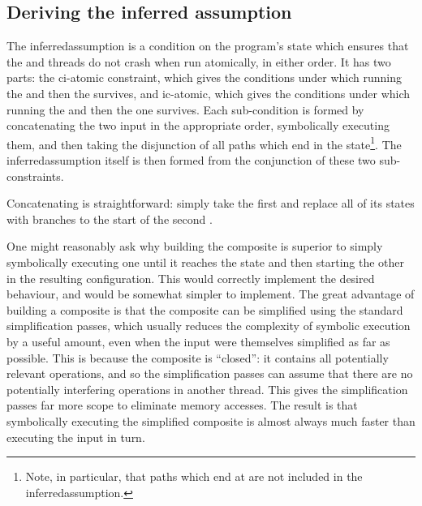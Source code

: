 \subsection{Deriving the inferred assumption}

\label{sect:derive:inferred_assumption}

The \gls{inferredassumption} is a condition on the program's state
which ensures that the  and
 threads do not crash when run
atomically, in either order.  It has two parts: the \gls{ci-atomic}
constraint, which gives the conditions under which running the
 {\StateMachine} and then the
 {\StateMachine} survives, and
\gls{ic-atomic}, which gives the conditions under which running the
 {\StateMachine} and then the
 one survives.  Each sub-condition
is formed by concatenating the two input {\StateMachines} in the
appropriate order, symbolically executing them, and then taking the
disjunction of all paths which end in the {\stSurvive}
state\footnote{Note, in particular, that paths which end at
  {\stUnreached} are not included in the \gls{inferredassumption}.}.
The \gls{inferredassumption} itself is then formed from the
conjunction of these two sub-constraints.

Concatenating {\StateMachines} is straightforward: simply take the
first {\StateMachine} and replace all of its {\stSurvive} states
with branches to the start of the second {\StateMachine}.

 One might reasonably ask why building the
composite {\StateMachine} is superior to simply symbolically executing
one {\StateMachine} until it reaches the {\stSurvive} state and then
starting the other {\StateMachine} in the resulting configuration.
This would correctly implement the desired behaviour, and would be
somewhat simpler to implement.  The great advantage of building a
composite {\StateMachine} is that the composite {\StateMachine} can be
simplified using the standard {\StateMachine} simplification passes,
which usually reduces the complexity of symbolic execution by a useful
amount, even when the input {\StateMachines} were themselves
simplified as far as possible.  This is because the composite
{\StateMachine} is ``closed'': it contains all potentially relevant
operations, and so the simplification passes can assume that there are
no potentially interfering operations in another thread.  This gives
the simplification passes far more scope to eliminate memory accesses.
The result is that symbolically executing the simplified composite
{\StateMachine} is almost always much faster than executing the input
{\StateMachines} in turn.

